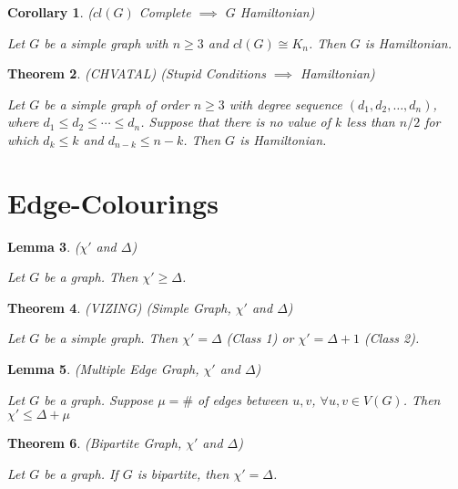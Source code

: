 \documentclass[12pt]{amsart}
\newtheorem{thm}{Theorem}
\newtheorem{lem}[thm]{Lemma}
\newtheorem{cor}[thm]{Corollary}
\theoremstyle{definition}
\begin{document}
\begin{cor} ($cl(G)$ Complete $\implies$ $G$ Hamiltonian)

Let $G$ be a simple graph with $n\geq 3$ and $cl(G)\cong K_n$. Then $G$ is Hamiltonian.
\end{cor}


\begin{thm} (CHVATAL) (Stupid Conditions $\implies$ Hamiltonian)

Let $G$ be a simple graph of order $n \geq 3$ with degree sequence $(d_1,d_2,\ldots,d_n)$, where
$d_1 \leq d_2 \leq \cdots \leq d_n$. Suppose that there is no value of $k$ less than $n/2$ for which
$d_k \leq k$ and $d_{n-k} \leq n-k$. Then $G$ is Hamiltonian.
\end{thm}

\section{Edge-Colourings}

\begin{lem} ($\chi'$ and $\Delta$)

Let $G$ be a graph. Then $\chi' \geq \Delta$.
\end{lem}

\begin{thm} (VIZING) (Simple Graph, $\chi'$ and $\Delta$)

Let $G$ be a simple graph. Then $\chi' = \Delta$ (Class 1) or $\chi' = \Delta+1$ (Class 2).
\end{thm}


\begin{lem} (Multiple Edge Graph, $\chi'$ and $\Delta$)

Let $G$ be a graph. Suppose $\mu=\#$ of edges between $u,v$, $\forall u,v\in V(G)$. Then $\chi' \leq \Delta+\mu$
\end{lem}


\begin{thm} (Bipartite Graph, $\chi'$ and $\Delta$)

Let $G$ be a graph. If $G$ is bipartite, then $\chi' = \Delta$.
\end{thm}
\end{document}
